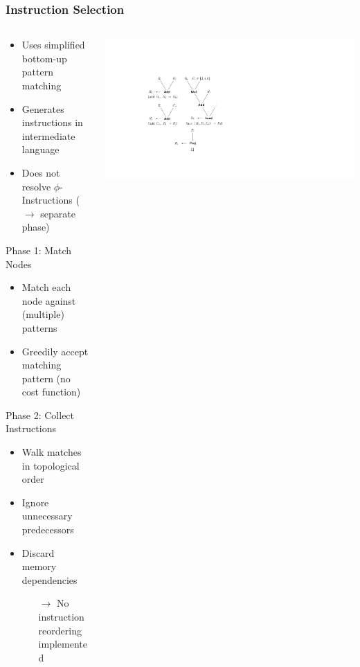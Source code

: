 \documentclass[navbaroff,en]{sdqbeamer}
\begin{document}
\begin{frame}
	\frametitle{Instruction Selection}
	\begin{columns}
		\begin{column}{0.55\textwidth}
			\begin{itemize}
				\item Uses simplified bottom-up pattern matching
				\item Generates instructions in intermediate language
				\item Does not resolve $\phi$-Instructions ($\rightarrow$ separate phase)
			\end{itemize}

			\vspace{1em}

			\begin{contentblock}{Phase 1: Match Nodes}
				\begin{itemize}
					\item Match each node against (multiple) patterns
					\item Greedily accept matching pattern (no cost function)
				\end{itemize}
			\end{contentblock}

			\begin{contentblock}{Phase 2: Collect Instructions}
				\begin{itemize}
					\item Walk matches in topological order
					\item Ignore unnecessary predecessors
					\item Discard memory dependencies
					\begin{itemize}
						\item[$\rightarrow$] No instruction reordering implemented
					\end{itemize}
				\end{itemize}
			\end{contentblock}
		\end{column}
		\begin{column}{0.44\textwidth}
		 	\centering \includegraphics[scale=0.4]{images/pattern.ipe.pdf}
		\end{column}
	\end{columns}

\end{frame}
\end{document}
